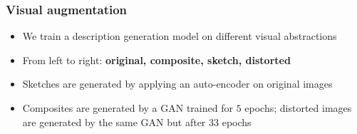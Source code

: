 \documentclass[aspectratio=1610]{beamer} %
\begin{document}
\begin{frame}
\frametitle{Visual augmentation}
\begin{figure}[htbp]
\centering
{}
\label{fig:generalexample}
\end{figure}
\begin{itemize}
	\item We train a description generation model on different visual abstractions %
	\item From left to right: \textbf{original, composite, sketch, distorted}
	\item Sketches are generated by applying an auto-encoder on original images
	\item Composites are generated by a GAN trained for $5$ epochs; distorted images are generated by the same GAN but after $33$ epochs
\end{itemize}
\end{frame}
\end{document}
